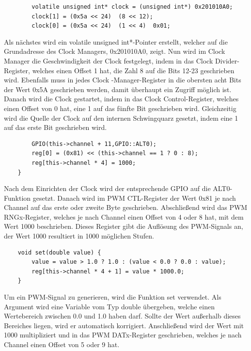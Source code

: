 \documentclass[12pt]{article}
\begin{document}
\begin{verbatim}        
        volatile unsigned int* clock = (unsigned int*) 0x201010A0;
        clock[1] = (0x5a << 24)  (8 << 12);
        clock[0] = (0x5a << 24)  (1 << 4)  0x01;
\end{verbatim}        
Als nächstes wird ein volatile unsigned int*-Pointer erstellt, welcher auf die Grundadresse des Clock Managers, 0x201010A0, zeigt. Nun wird im Clock Manager die Geschwindigkeit der Clock festgelegt, indem in das Clock Divider-Register, welches einen Offset 1 hat, die Zahl 8 auf die Bits 12-23 geschrieben wird. Ebenfalls muss in jedes Clock -Manager-Register in die obersten acht Bits der Wert 0x5A geschrieben werden, damit überhaupt ein Zugriff möglich ist. Danach wird die Clock gestartet, indem in das Clock Control-Register, welches einen Offset von 0 hat, eine 1 auf das fünfte Bit geschrieben wird. Gleichzeitig wird die Quelle der Clock auf den internen Schwingquarz gesetzt, indem eine 1 auf das erste Bit geschrieben wird.\\
\begin{verbatim}
        GPIO(this->channel + 11,GPIO::ALT0);
        reg[0] = (0x81) << (this->channel == 1 ? 0 : 8);
        reg[this->channel * 4] = 1000;
    } 
\end{verbatim}
Nach dem Einrichten der Clock wird der entsprechende GPIO auf die ALT0-Funktion gesetzt. Danach wird im PWM CTL-Register der Wert 0x81 je nach Channel auf das erste oder zweite Byte geschrieben. Abschließend wird das PWM RNGx-Register, welches je nach Channel einen Offset von 4 oder 8 hat, mit dem Wert 1000 beschrieben. Dieses Register gibt die Auflösung des PWM-Signals an, der Wert 1000 resultiert in 1000 möglichen Stufen.\\
\begin{verbatim}
    void set(double value) {
        value = value > 1.0 ? 1.0 : (value < 0.0 ? 0.0 : value);
        reg[this->channel * 4 + 1] = value * 1000.0;  
    }
\end{verbatim}
Um ein PWM-Signal zu generieren, wird die Funktion set verwendet. Als Argument wird eine Variable vom Typ double übergeben, welche einen Wertebereich zwischen 0.0 und 1.0 haben darf. Sollte der Wert außerhalb dieses Bereiches liegen, wird er automatisch korrigiert. Anschließend wird der Wert mit 1000 multipliziert und in das PWM DATx-Register geschrieben, welches je nach Channel einen Offset von 5 oder 9 hat.
\end{document}
